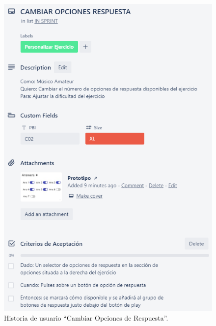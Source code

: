 \documentclass[12pt,twoside,titlepage]{report}
\begin{document}
\begin{figure}[H]
    \centering
    \includegraphics[scale=1.3]{Scrum/User Stories/CambiarRespuestas}
    \caption{Historia de usuario ``Cambiar Opciones de Respuesta''.}
    \label{fig:CambiarRespuestas}
\end{figure}
\end{document}
